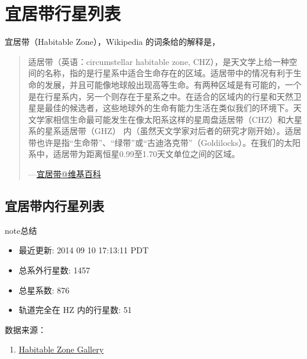 \documentclass[letterpaper,10pt,english]{sphinxmanual}
\begin{document}
\section{宜居带行星列表}
\label{hztable::doc}\label{hztable:id1}
宜居带（Habitable Zone），Wikipedia 的词条给的解释是，
\begin{quote}

适居带（英语：circumstellar habitable zone, CHZ），是天文学上给一种空间的名称，指的是行星系中适合生命存在的区域。适居带中的情况有利于生命的发展，并且可能像地球般出现高等生命。有两种区域是有可能的，一个是在行星系内，另一个则存在于星系之中。在适合的区域内的行星和天然卫星是最佳的候选者，这些地球外的生命有能力生活在类似我们的环境下。天文学家相信生命最可能发生在像太阳系这样的星周盘适居带（CHZ）和大星系的星系适居带（GHZ） 内（虽然天文学家对后者的研究才刚开始）。适居带也许是指“生命带”、“绿带”或“古迪洛克带”（Goldilocks）。在我们的太阳系中，适居带为距离恒星0.99至1.70天文单位之间的区域。

\begin{flushright}
---\href{https://zh.wikipedia.org/wiki/\%E9\%81\%A9\%E5\%B1\%85\%E5\%B8\%B6}{宜居带@维基百科}
\end{flushright}
\end{quote}


\subsection{宜居带内行星列表}
\label{hztable:index-0}\label{hztable:id3}
\begin{notice}{note}{总结}
\begin{itemize}
\item {} 
最近更新: 2014 09 10 17:13:11 PDT

\item {} 
总系外行星数: 1457

\item {} 
总星系数: 876

\item {} 
轨道完全在 HZ 内的行星数: 51

\end{itemize}

数据来源：
\begin{enumerate}
\item {} 
\href{http://www.hzgallery.org/}{Habitable Zone Gallery}

\end{enumerate}
\end{notice}
\end{document}
